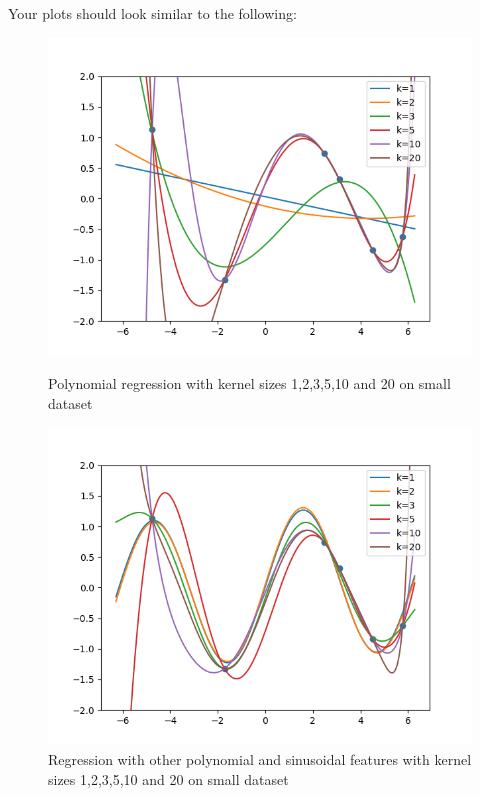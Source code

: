 Your plots should look similar to the following:
\begin{figure}[H]
  \centering
  \includegraphics[width=0.65\linewidth]{02-featuremaps/small-poly.png}
  \caption{Polynomial regression with kernel sizes 1,2,3,5,10 and 20
  on small dataset}
  
  \centering
  \vspace{2mm}
  \includegraphics[width=0.65\linewidth]{02-featuremaps/small-sine.png}
  \centering
  \caption{Regression with other polynomial and sinusoidal features with kernel sizes 1,2,3,5,10 and 20
  on small dataset}
\end{figure}
